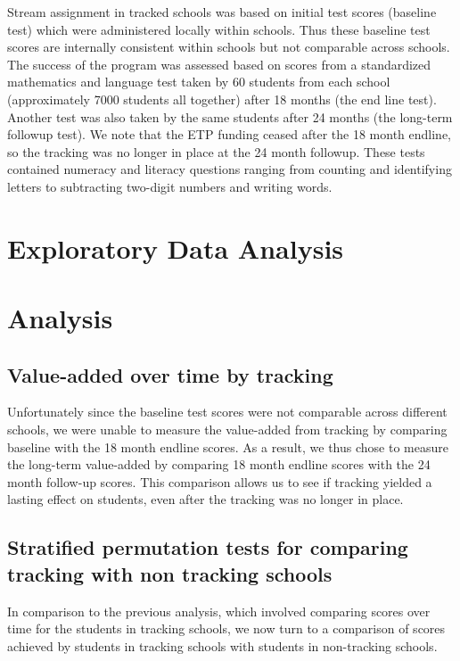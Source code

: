 \documentclass[11pt]{article}
\begin{document}
Stream assignment in tracked schools was based on initial test scores (baseline test) which were administered locally within schools. Thus these baseline test scores are internally consistent within schools but not comparable across schools. The success of the program was assessed based on scores from a standardized mathematics and language test taken by 60 students from each school (approximately 7000 students all together) after 18 months (the end line test). Another test was also taken by the same students after 24 months (the long-term followup test). We note that the ETP funding ceased after the 18 month endline, so the tracking was no longer in place at the 24 month followup. These tests contained numeracy and literacy questions ranging from counting and identifying letters to subtracting two-digit numbers and writing words.
 
 \section{Exploratory Data Analysis}
 
 \section{Analysis}
 \subsection{Value-added over time by tracking}
Unfortunately since the baseline test scores were not comparable across different schools, we were unable to measure the value-added from tracking by comparing baseline with the 18 month endline scores. As a result, we thus chose to measure the long-term value-added by comparing 18 month endline scores with the 24 month follow-up scores. This comparison allows us to see if tracking yielded a lasting effect on students, even after the tracking was no longer in place.

 \subsection{Stratified permutation tests for comparing tracking with non tracking schools}
In comparison to the previous analysis, which involved comparing scores over time for the students in tracking schools, we now turn to a comparison of scores achieved by students in tracking schools with students in non-tracking schools.
 
\end{document}
